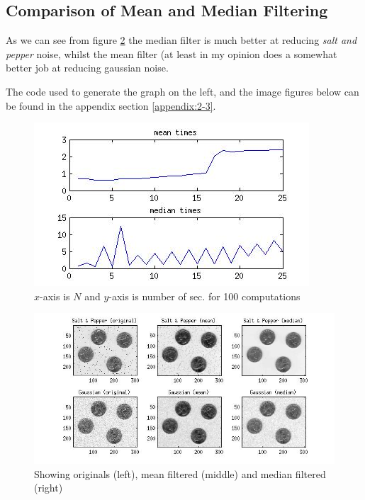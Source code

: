 \subsection{Comparison of Mean and Median Filtering}
\begin{multicols}{2}
As we can see from figure \ref{fig:2-3-a} the median filter is much better at
reducing {\it salt and pepper} noise, whilst the mean filter (at least in my
opinion does a somewhat better job at reducing gaussian noise.

The code used to generate the graph on the left, and the image figures below
can be found in the appendix section \ref{appendix:2-3}.
    \vfill{\ }\columnbreak
    
    \begin{figure}[H]
        \includegraphics[scale=0.6]{figures/2-3-b.jpg}
        \caption{$x$-axis is $N$ and $y$-axis is number of sec. for 100
        computations}
        \label{fig:2-3-b}
    \end{figure}
\end{multicols}
\begin{figure}[H]
    \center
    \includegraphics[scale=0.5]{figures/2-3-a.jpg}
    \caption{Showing originals (left), mean filtered (middle) and median
    filtered (right)}
    \label{fig:2-3-a}
\end{figure}

